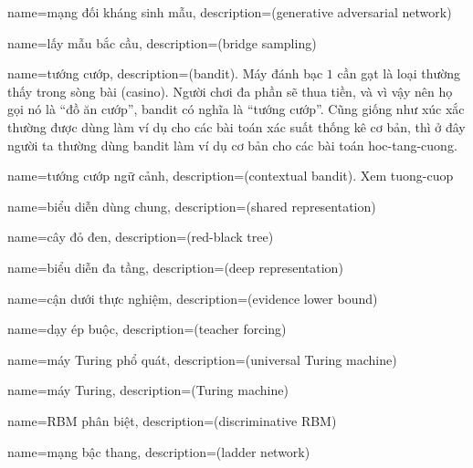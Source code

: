 {
    name={mạng đối kháng sinh mẫu},
    description={(generative adversarial network)}
}




{
    name={lấy mẫu bắc cầu},
    description={(bridge sampling)}
}

{
    name={tướng cướp},
    description={(bandit). Máy đánh bạc $1$ cần gạt là loại thường thấy trong sòng bài (casino). Người chơi đa phần sẽ thua tiền, và vì vậy nên họ gọi nó là ``đồ ăn cướp'', bandit có nghĩa là ``tướng cướp''. Cũng giống như xúc xắc thường được dùng làm ví dụ cho các bài toán xác suất thống kê cơ bản, thì ở đây người ta thường dùng bandit làm ví dụ cơ bản cho các bài toán \gls{hoc-tang-cuong}.}
}

{
    name={tướng cướp ngữ cảnh},
    description={(contextual bandit). Xem \gls{tuong-cuop}}
}

{
    name={biểu diễn dùng chung},
    description={(shared representation)}
}

{
    name={cây đỏ đen},
    description={(red-black tree)}
}

{
    name={biểu diễn đa tầng},
    description={(deep representation)}
}

{
    name={cận dưới thực nghiệm},
    description={(evidence lower bound)}
}


{
    name={dạy ép buộc},
    description={(teacher forcing)}
}

{
    name={máy Turing phổ quát},
    description={(universal Turing machine)}
}

{
    name={máy Turing},
    description={(Turing machine)}
}

{
    name={RBM phân biệt},
    description={(discriminative RBM)}
}

{
    name={mạng bậc thang},
    description={(ladder network)}
}


